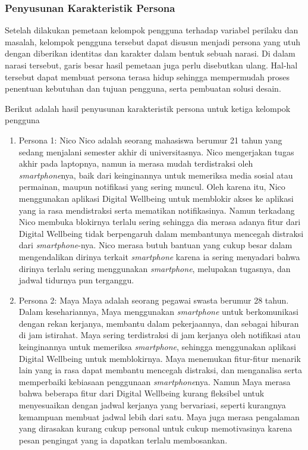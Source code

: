 \subsubsection{Penyusunan Karakteristik Persona}
Setelah dilakukan pemetaan kelompok pengguna terhadap variabel perilaku dan masalah, kelompok pengguna tersebut dapat disusun menjadi persona yang utuh dengan diberikan identitas dan karakter dalam bentuk sebuah narasi. Di dalam narasi tersebut, garis besar hasil pemetaan juga perlu disebutkan ulang. Hal-hal tersebut dapat membuat persona terasa hidup sehingga mempermudah proses penentuan kebutuhan dan tujuan pengguna, serta pembuatan solusi desain.

\newpage
Berikut adalah hasil penyusunan karakteristik persona untuk ketiga kelompok pengguna

\begin{enumerate}
  \item Persona 1: Nico
  \subitem Nico adalah seorang mahasiswa berumur 21 tahun yang sedang menjalani semester akhir di universitasnya. Nico mengerjakan tugas akhir pada laptopnya, namun ia merasa mudah terdistraksi oleh \textit{smartphone}nya, baik dari keinginannya untuk memeriksa media sosial atau permainan, maupun notifikasi yang sering muncul. Oleh karena itu, Nico menggunakan aplikasi Digital Wellbeing untuk memblokir akses ke aplikasi yang ia rasa mendistraksi serta mematikan notifikasinya. Namun terkadang Nico membuka blokirnya terlalu sering sehingga dia merasa adanya fitur dari Digital Wellbeing tidak berpengaruh dalam membantunya mencegah distraksi dari \textit{smartphone}-nya. Nico merasa butuh bantuan yang cukup besar dalam mengendalikan dirinya terkait \textit{smartphone} karena ia sering menyadari bahwa dirinya terlalu sering menggunakan \textit{smartphone}, melupakan tugasnya, dan jadwal tidurnya pun terganggu.

  \item Persona 2: Maya
  \subitem Maya adalah seorang pegawai swasta berumur 28 tahun. Dalam kesehariannya, Maya menggunakan \textit{smartphone} untuk berkomunikasi dengan rekan kerjanya, membantu dalam pekerjaannya, dan sebagai hiburan di jam istirahat. Maya sering terdistraksi di jam kerjanya oleh notifikasi atau keinginannya untuk memeriksa \textit{smartphone}, sehingga menggunakan aplikasi Digital Wellbeing untuk memblokirnya. Maya menemukan fitur-fitur menarik lain yang ia rasa dapat membantu mencegah distraksi, dan menganalisa serta memperbaiki kebiasaan penggunaan \textit{smartphone}nya. Namun Maya merasa bahwa beberapa fitur dari Digital Wellbeing kurang fleksibel untuk menyesuaikan dengan jadwal kerjanya yang bervariasi, seperti kurangnya kemampuan membuat jadwal lebih dari satu. Maya juga merasa pengalaman yang dirasakan kurang cukup personal untuk cukup memotivasinya karena pesan pengingat yang ia dapatkan terlalu membosankan.


\end{enumerate}
